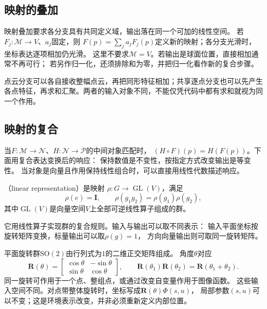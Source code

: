 \subsection{映射的叠加}
\label{sec:geometry-map-addition}

映射叠加要求各分支具有共同定义域，输出落在同一个可加的线性空间。
若$F_j:\mathcal M\to V$、$a_j$固定，则
$F(p)=\sum_j a_jF_j(p)$定义新的映射；各分支光滑时，坐标表达逐项相加仍光滑。
这里不要求$\mathcal M=V$。若输出是球面位置，直接相加通常不再可行；
若另作归一化，还须排除和为零，并把归一化看作新的复合步骤。

点云分支可以各自接收整幅点云，再把同形特征相加；共享逐点分支也可以先产生
各点特征，再求和汇聚。两者的输入对象不同，不能仅凭代码中都有求和就视为同一个作用。

\subsection{映射的复合}
\label{sec:geometry-map-composition}
\label{sec:geometry-group-invariance-equivariance}


当$F:\mathcal M\to\mathcal N$、$H:\mathcal N\to\mathcal P$的中间对象匹配时，
$(H\circ F)(p)=H(F(p))$。下面用复合表达变换后的响应：
保持数值是不变性，按指定方式改变输出是等变性。
当对象是向量且作用保持线性组合时，可以直接用线性代数描述响应。
\begin{definition}[线性表示]
\label{def:geometry-linear-representation}
（linear representation）是映射
$\rho:G\to\operatorname{GL}(V)$，满足
\begin{equation}
 \rho(e)=\bm I,\qquad \rho(g_1g_2)=\rho(g_1)\rho(g_2),
 \label{eq:geometry-linear-representation}
\end{equation}
其中$\operatorname{GL}(V)$是向量空间$V$上全部可逆线性算子组成的群。
\end{definition}
它用线性算子实现群的复合规则。输入与输出可以取不同表示：
输入平面坐标按旋转矩阵变换，标量输出可以取$\rho(g)=1$，
方向向量输出则可取同一旋转矩阵。

平面旋转群$\mathrm{SO}(2)$由行列式为$1$的二维正交矩阵组成。
角度$\theta$对应
\begin{equation}
 \bm R(\theta)=
 \begin{bmatrix}\cos\theta&-\sin\theta\\\sin\theta&\cos\theta\end{bmatrix},
 \qquad
 \bm R(\theta_1)\bm R(\theta_2)=\bm R(\theta_1+\theta_2).
 \label{eq:geometry-planar-rotation-group}
\end{equation}
同一旋转可作用于一个点、整组点，或通过改变自变量作用于图像函数。
这些输入空间不同。对点带整体旋转时，坐标写成$\bm R(\theta)\Phi(s,u)$，
局部参数$(s,u)$可以不变；这是环境表示改变，并非必须重新定义内部位置。


